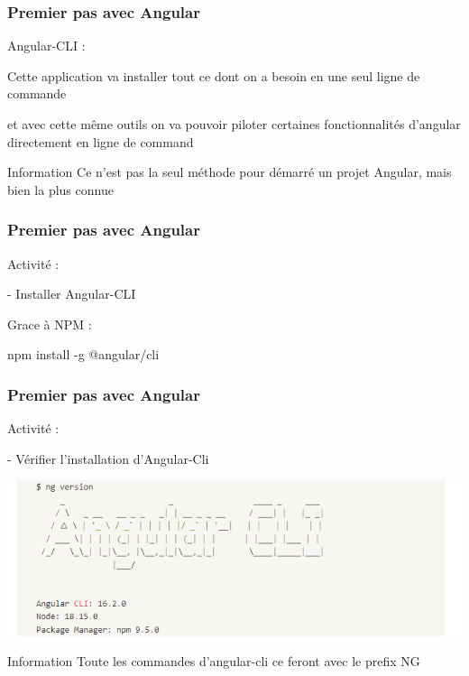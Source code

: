 \documentclass[10pt]{beamer}
\begin{document}
	\begin{frame}
		\frametitle{Premier pas avec Angular}

		Angular-CLI :  \newline \newline

		\centering
		Cette application va installer tout ce dont on a besoin \newline en une seul ligne de commande  \newline \newline

		et avec cette même outils on va pouvoir piloter certaines fonctionnalités d’angular directement en ligne de command  \newline \newline

		\begin{block}{Information}
			Ce n'est pas la seul méthode pour démarré un projet Angular, mais bien la plus connue
		\end{block}

	\end{frame}


	\begin{frame}
		\frametitle{Premier pas avec Angular}

		Activité : \newline \newline

		- Installer Angular-CLI  \newline \newline

		Grace à NPM :  \newline \newline

		npm install -g @angular/cli


	\end{frame}

	\begin{frame}
		\frametitle{Premier pas avec Angular}

		Activité : \newline \newline

		- Vérifier l'installation d'Angular-Cli  \newline \newline

		\includegraphics[width=16cm]{assets/angularCLInstall} \newline

		\begin{block}{Information}
			Toute les commandes d'angular-cli ce feront avec le prefix NG
		\end{block}

	\end{frame}
\end{document}
